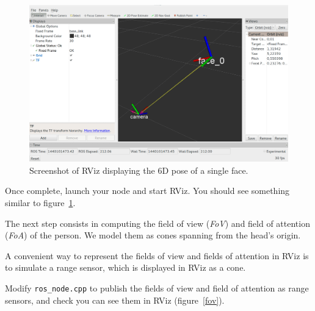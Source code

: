 \documentclass{instructions}
\begin{document}
\begin{figure}[h!]
    \centering
    \includegraphics[width=0.9\linewidth]{figs/rviz}
    \caption{Screenshot of RViz displaying the 6D
    pose of a single face.}
    \label{rviz}
\end{figure}

Once complete, launch your node and start RViz. You should see something similar
to figure~\ref{rviz}.



The next step consists in computing the field of view ({\it FoV}) and field of
attention ({\it FoA}) of the person. We model them as cones spanning from the
head's origin.



A convenient way to represent the fields of view and fields of attention in RViz
is to simulate a range sensor, which is displayed in RViz as a cone.

Modify {\tt ros\_node.cpp} to publish the
fields of view and field of attention as range sensors, and check you can see
them in RViz (figure~\ref{fov}).
\end{document}
